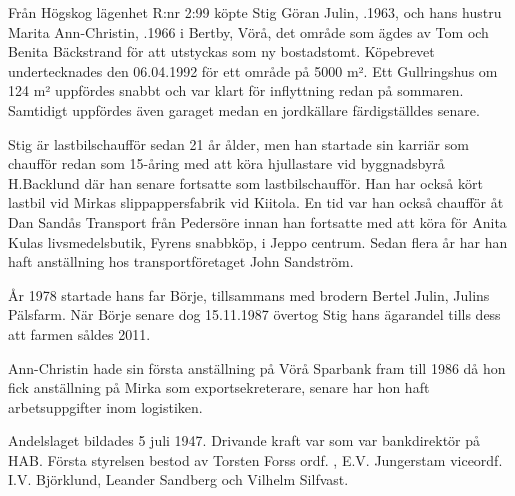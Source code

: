 

Från Högskog lägenhet R:nr 2:99 köpte Stig Göran Julin, .1963, och hans hustru Marita Ann-Christin, .1966 i Bertby, Vörå, det område som ägdes av Tom och Benita Bäckstrand för att utstyckas som ny bostadstomt. Köpebrevet undertecknades den 06.04.1992 för ett område på 5000 m². Ett Gullringshus om 124 m² uppfördes snabbt och var klart för inflyttning redan på sommaren. Samtidigt uppfördes även garaget medan en jordkällare färdigställdes senare.

Stig är lastbilschaufför sedan 21 år ålder, men han startade sin karriär som chaufför redan som 15-åring med att köra hjullastare vid byggnadsbyrå H.Backlund där han senare fortsatte som lastbilschaufför. Han har också kört lastbil vid Mirkas slippappersfabrik vid Kiitola. En tid var han också chaufför åt Dan Sandås Transport från Pedersöre innan han fortsatte med att köra för Anita Kulas livsmedelsbutik, Fyrens
snabbköp, i Jeppo centrum. Sedan flera år har han haft anställning hos transportföretaget John Sandström.

År 1978 startade hans far Börje, tillsammans med brodern Bertel Julin, Julins Pälsfarm. När Börje senare dog 15.11.1987 övertog Stig hans ägarandel tills dess att farmen såldes 2011.

Ann-Christin hade sin första anställning på Vörå Sparbank fram till 1986 då hon fick anställning på Mirka som exportsekreterare, senare har hon haft arbetsuppgifter inom logistiken.
\begin{jhchildren}
  \item {}
  \item {}
\end{jhchildren}



\jhnooccupant{}


Andelslaget bildades 5 juli 1947. Drivande kraft var  som var bankdirektör på HAB. Första styrelsen bestod av Torsten Forss ordf. , E.V. Jungerstam viceordf. I.V. Björklund, Leander Sandberg och Vilhelm Silfvast.


